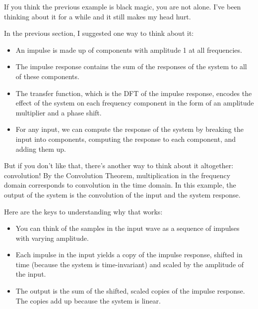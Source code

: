 \documentclass[12pt]{book} \usepackage[width=5.5in,height=8.5in, hmarginratio=3:2,vmarginratio=1:1]{geometry}
\begin{document}
If you think the previous example is black magic, you are not alone. I've been thinking about it for a while and it still makes my head hurt. 

In the previous section, I suggested one way to think about it: 

\begin{itemize} 

\item An impulse is made up of components with amplitude 1 at all frequencies. 

\item The impulse response contains the sum of the responses of the system to all of these components. 

\item The transfer function, which is the DFT of the impulse response, encodes the effect of the system on each frequency component in the form of an amplitude multiplier and a phase shift. 

\item For any input, we can compute the response of the system by breaking the input into components, computing the response to each component, and adding them up. 

\end{itemize} 

But if you don't like that, there's another way to think about it altogether: convolution! By the Convolution Theorem, multiplication in the frequency domain corresponds to convolution in the time domain. In this example, the output of the system is the convolution of the input and the system response. 

Here are the keys to understanding why that works: 

\begin{itemize} 

\item You can think of the samples in the input wave as a sequence of impulses with varying amplitude. 

\item Each impulse in the input yields a copy of the impulse response, shifted in time (because the system is time-invariant) and scaled by the amplitude of the input. 

\item The output is the sum of the shifted, scaled copies of the impulse response. The copies add up because the system is linear. 

\end{itemize} 
\end{document}
